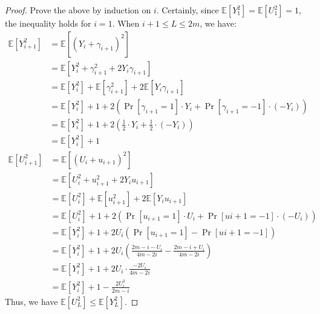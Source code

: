 \begin{proof}
    Prove the above by induction on $i$. Certainly, since
    $\mathbb{E}[Y_1^2]=\mathbb{E}[U_1^2]=1$, the inequality holds for $i=1$.
    When $i+1\le L\le 2m$, we have:
    \begin{align}
        \nonumber \mathbb{E}[Y_{i+1}^2]&=\mathbb{E}[(Y_i+\gamma_{i+1})^2]\\
        \nonumber &=\mathbb{E}[Y_i^2+\gamma_{i+1}^2+2Y_i\gamma_{i+1}]\\
        \nonumber &=\mathbb{E}[Y_i^2]+\mathbb{E}[\gamma_{i+1}^2]+2\mathbb{E}[Y_i\gamma_{i+1}]\\
        \nonumber &=\mathbb{E}[Y_i^2]+1+2(\Pr[\gamma_{i+1}=1]\cdot Y_i+\Pr[\gamma_{i+1}=-1]\cdot(-Y_i))\\
        \nonumber &=\mathbb{E}[Y_i^2]+1+2\left(\frac{1}{2}\cdot Y_i+\frac{1}{2}\cdot(-Y_i)\right)\\
        \nonumber &=\mathbb{E}[Y_i^2]+1   
    \end{align}
    \begin{align}
        \nonumber \mathbb{E}[U_{i+1}^2]&=\mathbb{E}[(U_i+u_{i+1})^2]\\
        \nonumber &=\mathbb{E}[U_i^2+u_{i+1}^2+2Y_iu_{i+1}]\\
        \nonumber &=\mathbb{E}[U_i^2]+\mathbb{E}[u_{i+1}^2]+2\mathbb{E}[Y_iu_{i+1}]\\
        \nonumber &=\mathbb{E}[U_i^2]+1+2(\Pr[u_{i+1}=1]\cdot U_i+\Pr[u{i+1}=-1]\cdot(-U_i))\\
        \nonumber &=\mathbb{E}[Y_i^2]+1+2U_i(\Pr[u_{i+1}=1]-\Pr[u{i+1}=-1])\\
        \nonumber &=\mathbb{E}\left[Y_i^2\right]+1+2U_i\left(\frac{2m-i-U_i}{4m-2i}-\frac{2m-i+U_i}{4m-2i}\right)\\
        \nonumber &=\mathbb{E}\left[Y_i^2\right]+1+2U_i\cdot \frac{-2U_i}{4m-2i}\\
        \nonumber &=\mathbb{E}\left[Y_i^2\right]+1-\frac{2U_i^2}{2m-i}
    \end{align}
    Thus, we have $\mathbb{E}[U_L^2]\le \mathbb{E}[Y_L^2]$. 
\end{proof}
